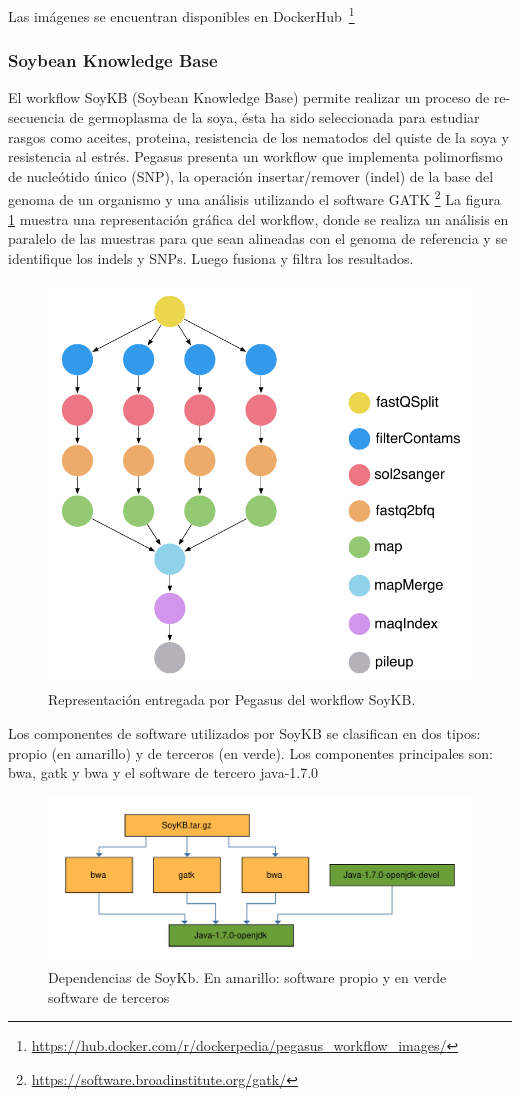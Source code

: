Las imágenes se encuentran disponibles en DockerHub~\footnote{\url{https://hub.docker.com/r/dockerpedia/pegasus_workflow_images/}}

\subsubsection{Soybean Knowledge Base}

El workflow SoyKB (Soybean Knowledge Base) \cite{joshi2012soybean} permite realizar un proceso de re-secuencia de germoplasma de la soya, ésta ha sido seleccionada para estudiar rasgos como aceites, proteina, resistencia de los nematodos del quiste de la soya y resistencia al estrés.
Pegasus presenta un workflow que implementa polimorfismo de nucleótido único (SNP), la operación insertar/remover (indel) de la base del genoma de un organismo y una análisis utilizando el software GATK \footnote{\url{https://software.broadinstitute.org/gatk/}}
La figura \ref{fig:soykb} muestra   una representación gráfica del workflow, donde se realiza un análisis en paralelo de las muestras para que sean alineadas con el genoma de referencia y se identifique los indels y SNPs. Luego fusiona y filtra los resultados. 

\begin{figure}[t]
\centering
\includegraphics[width=.5\textwidth]{Figures/workflow-genome}
\caption{Representación entregada por Pegasus del workflow SoyKB.}\label{fig:soykb}
\end{figure}

Los componentes de software utilizados por SoyKB se clasifican en dos tipos: propio (en amarillo) y de terceros (en verde). Los componentes principales son: bwa, gatk y bwa y el software de tercero java-1.7.0

\begin{figure}[t]
\centering
\includegraphics[width=.8\textwidth]{Figures/soykb-deps}
\caption{Dependencias de SoyKb. En amarillo: software propio y en verde software de terceros}\label{fig:modflow} 
\end{figure}

